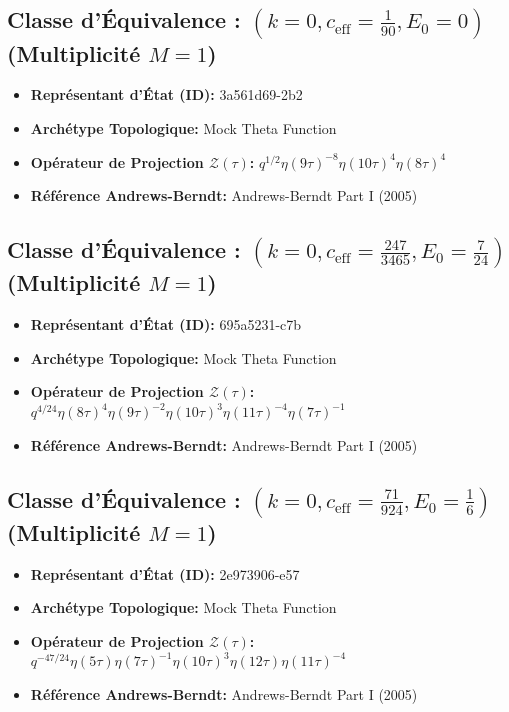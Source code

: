 \documentclass[11pt,twoside,openright]{book}
\begin{document}
\subsection*{Classe d'Équivalence : $(k=0, c_{\text{eff}}=\frac{1}{90}, E_0=0)$ (Multiplicité $M=1$)}
\begin{itemize}
  \item \textbf{Représentant d'État (ID):} 3a561d69-2b2
  \item \textbf{Archétype Topologique:} Mock Theta Function
  \item \textbf{Opérateur de Projection $\mathcal{Z}(\tau)$:} $q^{1/2} \eta(9\tau)^{-8} \eta(10\tau)^{4} \eta(8\tau)^{4}$
  \item \textbf{Référence Andrews-Berndt:} Andrews-Berndt Part I (2005)
\end{itemize}

\subsection*{Classe d'Équivalence : $(k=0, c_{\text{eff}}=\frac{247}{3465}, E_0=\frac{7}{24})$ (Multiplicité $M=1$)}
\begin{itemize}
  \item \textbf{Représentant d'État (ID):} 695a5231-c7b
  \item \textbf{Archétype Topologique:} Mock Theta Function
  \item \textbf{Opérateur de Projection $\mathcal{Z}(\tau)$:} $q^{4/24} \eta(8\tau)^{4} \eta(9\tau)^{-2} \eta(10\tau)^{3} \eta(11\tau)^{-4} \eta(7\tau)^{-1}$
  \item \textbf{Référence Andrews-Berndt:} Andrews-Berndt Part I (2005)
\end{itemize}

\subsection*{Classe d'Équivalence : $(k=0, c_{\text{eff}}=\frac{71}{924}, E_0=\frac{1}{6})$ (Multiplicité $M=1$)}
\begin{itemize}
  \item \textbf{Représentant d'État (ID):} 2e973906-e57
  \item \textbf{Archétype Topologique:} Mock Theta Function
  \item \textbf{Opérateur de Projection $\mathcal{Z}(\tau)$:} $q^{-47/24} \eta(5\tau) \eta(7\tau)^{-1} \eta(10\tau)^{3} \eta(12\tau) \eta(11\tau)^{-4}$
  \item \textbf{Référence Andrews-Berndt:} Andrews-Berndt Part I (2005)
\end{itemize}
\end{document}
